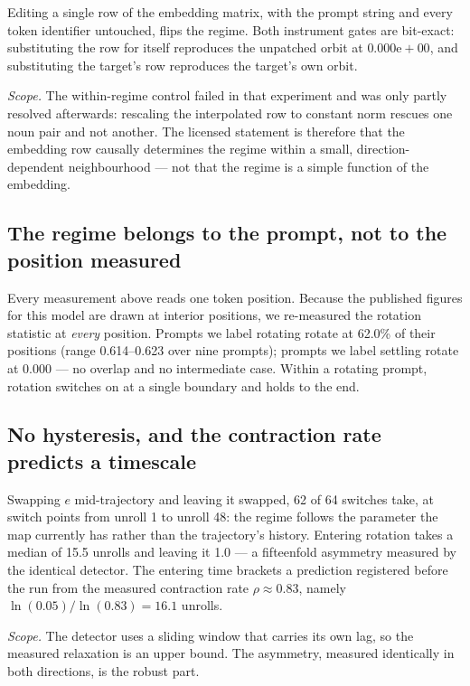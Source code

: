 \documentclass{zapiski}
\begin{document}
Editing a single row of the embedding matrix, with the prompt string and every token identifier
untouched, flips the regime. Both instrument gates are bit-exact: substituting the row for itself
reproduces the unpatched orbit at $0.000\mathrm{e}{+}00$, and substituting the target's row
reproduces the target's own orbit.

\emph{Scope.} The within-regime control failed in that experiment and was only partly resolved
afterwards: rescaling the interpolated row to constant norm rescues one noun pair and not
another. The licensed statement is therefore that the embedding row causally determines the
regime within a small, direction-dependent neighbourhood --- not that the regime is a simple
function of the embedding.

\subsection{The regime belongs to the prompt, not to the position measured}

Every measurement above reads one token position. Because the published figures for this model
are drawn at interior positions, we re-measured the rotation statistic at \emph{every} position.
Prompts we label rotating rotate at 62.0\% of their positions (range 0.614--0.623 over nine
prompts); prompts we label settling rotate at 0.000 --- no overlap and no intermediate case.
Within a rotating prompt, rotation switches on at a single boundary and holds to the end.

\subsection{No hysteresis, and the contraction rate predicts a timescale}

Swapping $e$ mid-trajectory and leaving it swapped, 62 of 64 switches take, at switch points from
unroll 1 to unroll 48: the regime follows the parameter the map currently has rather than the
trajectory's history. Entering rotation takes a median of 15.5 unrolls and leaving it 1.0 --- a
fifteenfold asymmetry measured by the identical detector. The entering time brackets a prediction
registered before the run from the measured contraction rate $\rho \approx 0.83$, namely
$\ln(0.05)/\ln(0.83) = 16.1$ unrolls.

\emph{Scope.} The detector uses a sliding window that carries its own lag, so the measured
relaxation is an upper bound. The asymmetry, measured identically in both directions, is the
robust part.
\end{document}
